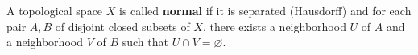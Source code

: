A topological space $X$ is called \textbf{normal} if it is separated (Hausdorff) and for each pair $A, B$ of disjoint closed subsets of $X$, there exists a neighborhood $U$ of $A$ and a neighborhood $V$ of $B$ such that $U \cap V = \varnothing$.
